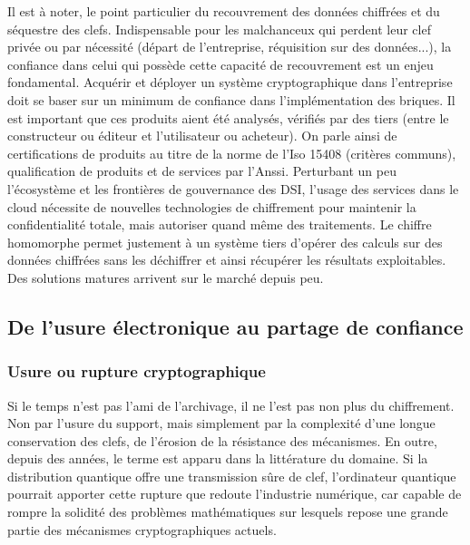 

 Il est à noter, le point particulier du recouvrement des données chiffrées et du séquestre des clefs. Indispensable pour les malchanceux qui perdent leur clef privée ou par nécessité (départ de l'entreprise, réquisition sur des données...), la confiance dans celui qui possède cette capacité de recouvrement est un enjeu fondamental.
Acquérir et déployer un système cryptographique dans l'entreprise doit se baser sur un minimum de confiance dans
l'implémentation des briques. Il est important que ces produits aient été analysés, vérifiés par des tiers (entre le constructeur ou éditeur et l'utilisateur ou acheteur). On parle ainsi de certifications de produits au titre de la norme de l'Iso 15408 (critères communs), qualification de produits et de services par l'Anssi. Perturbant un peu l'écosystème et les frontières de gouvernance des DSI, l'usage des services dans le cloud nécessite de nouvelles technologies de chiffrement pour maintenir la confidentialité totale, mais autoriser quand même des traitements. Le chiffre homomorphe permet justement à un système tiers d'opérer des calculs sur des données chiffrées sans les déchiffrer et ainsi récupérer les résultats exploitables. Des solutions matures arrivent sur le marché depuis peu.


\subsection{De l'usure électronique au partage de confiance}

\subsubsection{Usure ou rupture cryptographique}
Si le temps n'est pas l'ami de l'archivage, il ne l'est pas non plus du chiffrement. Non par l'usure du support, mais simplement par la complexité d'une longue conservation des clefs, de l'érosion de la résistance des mécanismes. En outre, depuis des années, le terme est apparu dans la littérature du domaine. Si la distribution quantique offre une transmission sûre de clef, l'ordinateur quantique pourrait apporter cette rupture que redoute l'industrie numérique, car capable de rompre la solidité des problèmes mathématiques sur lesquels repose une grande partie des mécanismes cryptographiques actuels.
